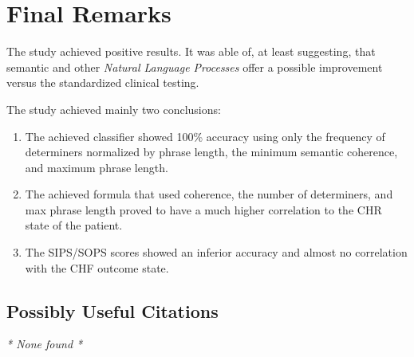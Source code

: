 \documentclass{Paper_Summary}
\begin{document}
\section{Final Remarks}
    
    The study achieved positive results. It was able of, at least suggesting, that semantic and other \emph{Natural Language Processes} offer a possible improvement versus the standardized clinical testing.

    The study achieved mainly two conclusions:
    \begin{enumerate}
        \item The achieved classifier showed 100\% accuracy using only the frequency of determiners normalized by phrase length, the minimum semantic coherence, and maximum phrase length.
        \item The achieved formula that used coherence, the number of determiners, and max phrase length proved to have a much higher correlation to the CHR state of the patient.
        \item The SIPS/SOPS scores showed an inferior accuracy and almost no correlation with the CHF outcome state.
    \end{enumerate}

\breakline

\begin{center}
    \section*{Possibly Useful Citations}
\end{center}
    \emph{* None found *}
\end{document}
